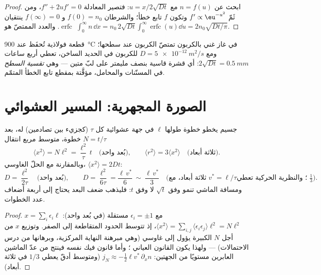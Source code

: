 \begin{proof}
ابحث عن $n = f(u)$ مع $u = x/2\sqrt{Dt}$: فتصير المعادلة
$f'' + 2uf' = 0$، ومن ثَمّ $f' \propto \eu^{-u^2}$ وتكون $f$ تابع
خطأ؛ والشرطان $f(0) = n_0$ و $f(\infty) = 0$ ينتقيان
$\operatorname{erfc}$. والعدد الممتصّ هو $\int_0^\infty n\,\dd x =
n_0\,2\sqrt{Dt}\int_0^\infty\operatorname{erfc}(u)\dd u = 2n_0\sqrt{Dt/\pi}$.
\end{proof}

\begin{example}\label{ex:b2:particle-diffusion:carburising}
قطعة فولاذية تُحفَظ عند \qty{900}{\celsius} في غاز غني بالكربون تمتصّ
الكربون عند سطحها؛ ومع $D = \qty{5e-12}{m^2/s}$ للكربون في الحديد
الساخن، تعطي أربع ساعات $2\sqrt{Dt} = \qty{0.5}{mm}$: أي قشرة قاسية بنصف
مليمتر على لبّ متين --- وهي \emph{تقسية السطح} في المسنّنات
والمحامل، مؤقَّتة بمقطع تابع الخطأ المتمّم.
\end{example}

\section{الصورة المجهرية: المسير العشوائي}\label{sec:b2:particle-diffusion:microscopic}

\begin{proposition}\label{prop:b2:particle-diffusion:walk}
جسيم يخطو خطوة طولها $\ell$ في جهة عشوائية
كل $\tau$ (كجزيء بين تصادمين) له، بعد $N =
t/\tau$ خطوة، متوسط مربع انتقال
\[
\langle x^2\rangle = N\ell^2 = \frac{\ell^2}{\tau}\,t
\quad\text{(بُعد واحد)}, \qquad
\langle r^2\rangle = 3\langle x^2\rangle \quad\text{(ثلاثة أبعاد)}.
\]
وبالمقارنة مع الحلّ الغاوسي، $\langle x^2\rangle = 2Dt$:
\[
D = \frac{\ell^2}{2\tau} \quad\text{(بُعد واحد)}, \qquad
D = \frac{\ell^2}{6\tau} = \frac{\ell\,v^*}{6}\ \sim\ \frac{\ell\,v^*}{3}
\quad\text{(ثلاثة أبعاد، مع } v^* = \ell/\tau\text{؛ والنظرية الحركية تعطي } \tfrac13) .
\]
ومسافة الماشي تنمو وفق $\sqrt t$ لا وفق $t$: فليذهب ضعف البعد
يحتاج إلى أربعة أضعاف عدد الخطوات.
\end{proposition}

\begin{proof}
$x = \sum_i \epsilon_i\ell$ مع $\epsilon_i = \pm1$ مستقلة (في بُعد واحد):
$\langle x^2\rangle = \sum_{i,j}\langle\epsilon_i\epsilon_j\rangle\ell^2 =
N\ell^2$، إذ تتوسط الحدود المتقاطعة إلى الصفر. وتوزيع $x$
من أجل $N$ الكبيرة يؤول إلى غاوسي (وهي مبرهنة النهاية المركزية، وبرهانها
من درس الاحتمالات) --- ولهذا يكون القانون
العياني ؛ وأما قانون فيك نفسه فينتج
من عدّ الماشين العابرين مستويًا من الجهتين: $j_N \approx
-\tfrac12\ell v^*\,\partial_x n$ (ومتوسط أدقّ يعطي $1/3$ في
ثلاثة أبعاد).
\end{proof}

